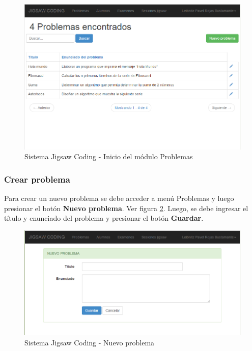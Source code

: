 \begin{figure}[h!]
\centering
\caption[SJC Problemas]{Sistema Jigsaw Coding - Inicio del módulo Problemas}
\label{fig:problemas_inicio}
\includegraphics[scale=0.5]{figuras/usodelsistema/docente/problemas_inicio}
\end{figure}

\subsubsection{Crear problema}

Para crear un nuevo problema se debe acceder a menú Problemas y luego presionar el botón \textbf{Nuevo problema}. Ver figura \ref{fig:problemas_nuevo}. Luego, se debe ingresar el título y enunciado del problema y presionar el botón \textbf{Guardar}.

\begin{figure}[h!]
\centering
\caption[SJC Nuevo problema]{Sistema Jigsaw Coding - Nuevo problema}
\label{fig:problemas_nuevo}
\includegraphics[scale=0.5]{figuras/usodelsistema/docente/problemas_nuevo}
\end{figure}

